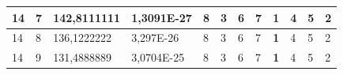 \documentclass[conference]{IEEEtran}
\begin{document}
\begin{table}[]
\begin{tabular}{|llll|llllllll|}
\multicolumn{1}{|l|}{14}                                                             & \multicolumn{1}{l|}{7}                                                                 & \multicolumn{1}{l|}{142,8111111}                                                           & 1,3091E-27                              & \multicolumn{1}{l|}{8}                                                           & \multicolumn{1}{l|}{3}                                                           & \multicolumn{1}{l|}{6}                                                           & \multicolumn{1}{l|}{7}                                                           & \multicolumn{1}{l|}{\textbf{1}}                                                  & \multicolumn{1}{l|}{4}                                                           & \multicolumn{1}{l|}{5}                                                           & 2                                   \\ \hline
\multicolumn{1}{|l|}{14}                                                             & \multicolumn{1}{l|}{8}                                                                 & \multicolumn{1}{l|}{136,1222222}                                                           & 3,297E-26                               & \multicolumn{1}{l|}{8}                                                           & \multicolumn{1}{l|}{3}                                                           & \multicolumn{1}{l|}{6}                                                           & \multicolumn{1}{l|}{7}                                                           & \multicolumn{1}{l|}{\textbf{1}}                                                  & \multicolumn{1}{l|}{4}                                                           & \multicolumn{1}{l|}{5}                                                           & 2                                   \\ \hline
\multicolumn{1}{|l|}{14}                                                             & \multicolumn{1}{l|}{9}                                                                 & \multicolumn{1}{l|}{131,4888889}                                                           & 3,0704E-25                              & \multicolumn{1}{l|}{8}                                                           & \multicolumn{1}{l|}{3}                                                           & \multicolumn{1}{l|}{6}                                                           & \multicolumn{1}{l|}{7}                                                           & \multicolumn{1}{l|}{\textbf{1}}                                                  & \multicolumn{1}{l|}{4}                                                           & \multicolumn{1}{l|}{5}                                                           & 2                                   \\ \hline

\end{tabular}
\end{table}
\end{document}
